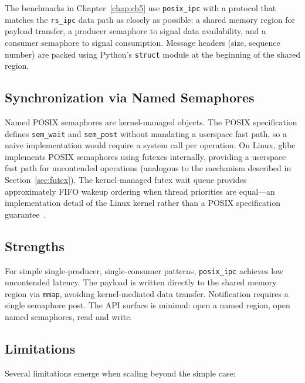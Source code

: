 The benchmarks in Chapter~\ref{chap:ch5} use \texttt{posix\_ipc} with a protocol that matches the \texttt{rs\_ipc} data path as closely as possible: a shared memory region for payload transfer, a producer semaphore to signal data availability, and a consumer semaphore to signal consumption. Message headers (size, sequence number) are packed using Python's \texttt{struct} module at the beginning of the shared region.

\subsection{Synchronization via Named Semaphores}

Named POSIX semaphores are kernel-managed objects. The POSIX specification defines \texttt{sem\_wait} and \texttt{sem\_post} without mandating a userspace fast path, so a naive implementation would require a system call per operation. On Linux, glibc implements POSIX semaphores using futexes internally, providing a userspace fast path for uncontended operations (analogous to the mechanism described in Section~\ref{sec:futex}). The kernel-managed futex wait queue provides approximately FIFO wakeup ordering when thread priorities are equal---an implementation detail of the Linux kernel rather than a POSIX specification guarantee~\cite{franke2002}.

\subsection{Strengths}

For simple single-producer, single-consumer patterns, \texttt{posix\_ipc} achieves low uncontended latency. The payload is written directly to the shared memory region via \texttt{mmap}, avoiding kernel-mediated data transfer. Notification requires a single semaphore post. The API surface is minimal: open a named region, open named semaphores, read and write.

\subsection{Limitations}

Several limitations emerge when scaling beyond the simple case:

